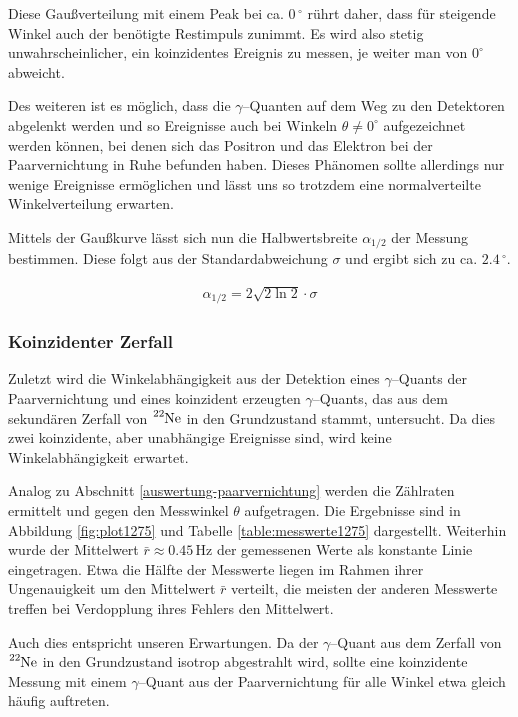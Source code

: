 \documentclass[12pt,a4paper]{scrartcl}
\numberwithin{equation}{section} %
\begin{document}
Diese Gaußverteilung mit einem Peak bei ca. $0\,^\circ$ rührt daher, dass für steigende Winkel auch der benötigte Restimpuls zunimmt. Es wird also stetig unwahrscheinlicher, ein koinzidentes Ereignis zu messen, je weiter man von $0^\circ$ abweicht.

Des weiteren ist es möglich, dass die $\gamma$--Quanten auf dem Weg zu den Detektoren abgelenkt werden und so Ereignisse auch bei Winkeln $\theta\neq 0^\circ$ aufgezeichnet werden können, bei denen sich das Positron und das Elektron bei der Paarvernichtung in Ruhe befunden haben. Dieses Phänomen sollte allerdings nur wenige Ereignisse ermöglichen und lässt uns so trotzdem eine normalverteilte Winkelverteilung erwarten.

Mittels der Gaußkurve lässt sich nun die Halbwertsbreite $\alpha_{1/2}$ der Messung bestimmen. Diese folgt aus der Standardabweichung $\sigma$ und ergibt sich zu ca. $2.4 \mathrm{\, ^\circ}$.

\begin{eqnarray}
	\alpha_{1/2} = 2 \sqrt{2 \ln 2} \cdot \sigma
\end{eqnarray}

\subsubsection{Koinzidenter Zerfall}
Zuletzt wird die Winkelabhängigkeit aus der Detektion eines $\gamma$--Quants der Paarvernichtung und eines koinzident erzeugten $\gamma$--Quants, das aus dem sekundären Zerfall von $\ce{^{22}Ne}$ in den Grundzustand stammt, untersucht. Da dies zwei koinzidente, aber unabhängige Ereignisse sind, wird keine Winkelabhängigkeit erwartet.

Analog zu Abschnitt \ref{auswertung-paarvernichtung} werden die Zählraten ermittelt und gegen den Messwinkel $\theta$ aufgetragen. Die Ergebnisse sind in Abbildung \ref{fig:plot1275} und Tabelle \ref{table:messwerte1275} dargestellt. Weiterhin wurde der Mittelwert $\bar r\approx 0.45\,\mathrm{Hz}$ der gemessenen Werte als konstante Linie eingetragen. Etwa die Hälfte der Messwerte liegen im Rahmen ihrer Ungenauigkeit um den Mittelwert $\bar r$ verteilt, die meisten der anderen Messwerte treffen bei Verdopplung ihres Fehlers den Mittelwert.

Auch dies entspricht unseren Erwartungen. Da der $\gamma$--Quant aus dem Zerfall von $\ce{^{22}Ne}$ in den Grundzustand isotrop abgestrahlt wird, sollte eine koinzidente Messung mit einem $\gamma$--Quant aus der Paarvernichtung für alle Winkel etwa gleich häufig auftreten.
\end{document}
